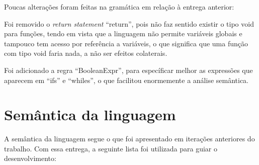 \documentclass[12pt]{article}
\begin{document}
Poucas alterações foram feitas na gramática em relação à entrega anterior:

Foi removido o \textit{return statement} ``return'', pois não faz sentido existir o tipo void para funções, tendo em vista que a linguagem não permite variáveis globais e tampouco tem acesso por referência a variáveis, o que significa que uma função com tipo void faria nada, a não ser efeitos colaterais.

Foi adicionado a regra ``BooleanExpr'', para específicar melhor as expressões que aparecem em ``ifs'' e ``whiles'', o que facilitou enormemente a análise semântica.

\section{Semântica da linguagem}

\indent

A semântica da linguagem segue o que foi apresentado em iterações anteriores do trabalho. Com essa entrega, a seguinte lista foi utilizada para guiar o desenvolvimento:
\end{document}
